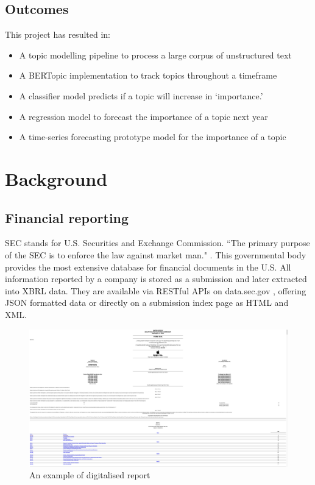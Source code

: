 \documentclass[12pt,MSc,a4paper,oneside]{muthesis}
\begin{document}
\section{Outcomes}
This project has resulted in:
\begin{itemize}
  \item A topic modelling pipeline to process a large corpus of unstructured
text
  \item A BERTopic implementation to track topics throughout a timeframe
  \item A classifier model predicts if a topic will increase in ‘importance.’
  \item A regression model to forecast the importance of a topic next year
  \item A time-series forecasting prototype model for the importance of a topic
\end{itemize}

\chapter{Background}

\section{Financial reporting}
SEC stands for U.S. Securities and Exchange Commission. “The primary purpose of the SEC is to enforce the law against market man." \cite{wiki:sec}. This governmental body provides the most extensive database for financial documents in the U.S. All information reported by a company is stored as a submission and later extracted into XBRL data. They are available via RESTful APIs on data.sec.gov \cite{sec-api-docs}, offering JSON formatted data or directly on a submission index page as HTML and XML.

\begin{figure}[h]
    \centering
    \includegraphics[scale=0.1]{images/Example Annual Report.png}
    \caption{An example of digitalised report \cite{digitalised-report-example}}
\end{figure}
\end{document}
